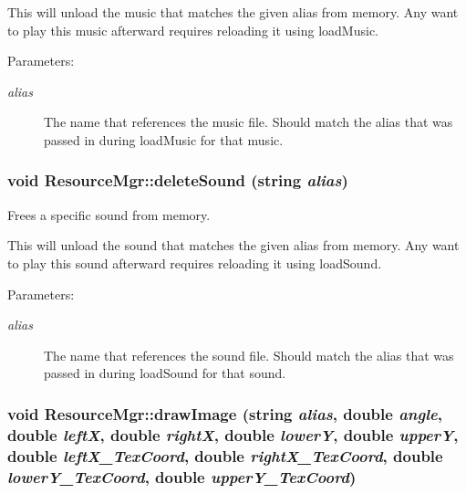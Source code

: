 This will unload the music that matches the given alias from memory. Any want to play this music afterward requires reloading it using loadMusic. \begin{Desc}
\item[Parameters:]
\begin{description}
\item[{\em alias}]The name that references the music file. Should match the alias that was passed in during loadMusic for that music. \end{description}
\end{Desc}
\hypertarget{class_resource_mgr_fe32796d9e6aad358646f8e9463c77a8}{
\subsubsection[{deleteSound}]{\setlength{\rightskip}{0pt plus 5cm}void ResourceMgr::deleteSound (string {\em alias})}}
\label{class_resource_mgr_fe32796d9e6aad358646f8e9463c77a8}


Frees a specific sound from memory. 

This will unload the sound that matches the given alias from memory. Any want to play this sound afterward requires reloading it using loadSound. \begin{Desc}
\item[Parameters:]
\begin{description}
\item[{\em alias}]The name that references the sound file. Should match the alias that was passed in during loadSound for that sound. \end{description}
\end{Desc}
\hypertarget{class_resource_mgr_4a7ff6c298fec087d6080bbb46bea663}{
\subsubsection[{drawImage}]{\setlength{\rightskip}{0pt plus 5cm}void ResourceMgr::drawImage (string {\em alias}, \/  double {\em angle}, \/  double {\em leftX}, \/  double {\em rightX}, \/  double {\em lowerY}, \/  double {\em upperY}, \/  double {\em leftX\_\-TexCoord}, \/  double {\em rightX\_\-TexCoord}, \/  double {\em lowerY\_\-TexCoord}, \/  double {\em upperY\_\-TexCoord})}}
\label{class_resource_mgr_4a7ff6c298fec087d6080bbb46bea663}



